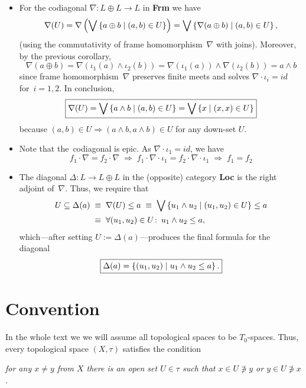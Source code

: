 \begin{itemize}
\item
{}
\label{codiag-in-Frm}
For the codiagonal $\nabla\colon L \oplus L \to L$ in {\bf Frm} we have
\[
  \nabla(U)
  = \nabla \left( \bigvee \left\{ a \oplus b \mid (a, b)\in U \right\} \right)
  = \bigvee \left\{ \nabla(a \oplus b) \mid (a, b)\in U \right\},
\]
(using the commutativity of frame homomorphism~$\nabla$ with joins).
Moreover, by the previous corollary,
\[
  \nabla(a \oplus b)
  = \nabla( \iota_1(a) \wedge \iota_2(b) )
  = \nabla(\iota_1(a)) \wedge \nabla(\iota_2(b))
  = a \wedge b
\]
since frame homomorphism~$\nabla$ preserves finite meets and solves
$\nabla\cdot \iota_i = id$ for~$i = 1, 2$.
In conclusion,
\[
  \boxed{
    \nabla(U)
    = \bigvee \left\{ a \wedge b \mid (a, b)\in U \right\}
    = \bigvee \left\{ x \mid (x, x)\in U \right\}
  }
\]
because $(a, b)\in U \Rightarrow (a \wedge b, a \wedge b)\in U$ for any
down-set $U$.

\item Note that the~codiagonal is epic.
As $\nabla \cdot \iota_1 = id$, we have
\[
  f_1 \cdot \nabla = f_2 \cdot \nabla
  \; \Longrightarrow \;
  f_1 \cdot \nabla \cdot \iota_1 = f_2 \cdot \nabla \cdot \iota_1
  \; \Longrightarrow \;
  f_1 = f_2
\]

\item The diagonal $\Delta\colon L \to L \oplus L$ in the (opposite) category
{\bf Loc} is the right adjoint of~$\nabla$.
Thus, we require that
\begin{align*}
  U\subseteq \Delta(a)
  \; &\equiv \; \nabla(U) \le a
  \; \equiv \; \bigvee \left\{ u_1 \wedge u_2 \mid (u_1, u_2)\in U \right\} \le
  a \\
  \; &\equiv \; \forall (u_1, u_2)\in U\colon \, u_1 \wedge u_2 \le a,
\end{align*}
which---after setting $U := \Delta(a)$---produces the final formula for the
diagonal
\[
  \boxed{
    \Delta(a) = \left\{ (u_1, u_2) \mid u_1 \wedge u_2 \le a \right\}.
  }
\]
\end{itemize}

\section*{Convention}

In the whole text we we will assume all topological spaces to be $T_0$-spaces.
Thus, every topological space $(X, \tau)$ satisfies the condition
\begin{center} \it
  for any $x \ne y$ from $X$ there is an open set $U \in \tau$ such that $x \in
  U \not\owns y$ or $y \in U \not\owns x$.
\end{center}

